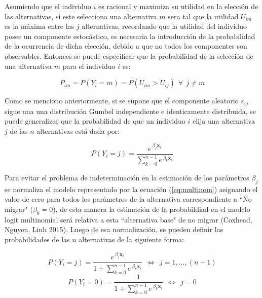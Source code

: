 \documentclass[12pt,a4paper]{article}
\begin{document}
Asumiendo que el individuo $i$ es racional y maximiza su utilidad en la elección de las  alternativas, si este selecciona una alternativa $m$ sera tal que la utilidad $U_{im}$ es la máxima entre las $j$ alternativas, recordando que la utilidad del individuo posee un componente estocástico, es necesaria la introducción de la probabilidad de la ocurrencia de dicha elección, debido a que no todos los componentes son observables. Entonces se puede especificar que  la probabilidad de la selección de una alternativa $m$ para el individuo $i$ es:
\begin {center}
\begin{equation}\label{eq:prob}
P_{im}=P{(Y_{i}=m)} =P(U_{im}>U_{ij}) \ \ \forall \ \ j\neq m
\end{equation}
\end {center}

Como se menciono anteriormente, si se supone que el componente aleatorio $\varepsilon_{ij}$ sigue una una distribución Gumbel independiente e identicamente distribuida, se puede generalizar que la probabilidad de que un individuo $i$ elija una alternativa $j$ de las $n$ alternativas está dada por:
\begin {center}
\begin{equation}\label{eq:multinom}
P{(Y_{i}=j)}=\frac{e^{\ \beta_{j} \textbf{x}_{i}}}{\sum_{k=0}^{n-1}e^{\ \beta_{k} \textbf{x}_{i}}}
\end{equation}
\end {center}

Para evitar el problema de indeterminación en la estimación de los parámetros $\beta_{j}$ se normaliza el modelo representado por la ecuación (\ref{eq:multinom}) asignando el valor de cero para todos los parámetros de la alternativa correspondiente a ``No migrar" ($\beta_{0}=0$), de esta manera la estimación de la probabildiad en el modelo logit multinomial será relativa a esta ``alternativa base" de no migrar (Coxhead, Nguyen, Linh 2015).
Luego de esa normalización, se pueden definir las probabilidades de las $n$ alternativas de la siguiente forma:
\begin {center}
\begin{equation}\label{eq:multinom_2}
P{(Y_{i}=j)}=\frac{e^{\ \beta_{j} \textbf{x}_{i}}}{1+\sum_{k=0}^{n-1}e^{\ \beta_{k} \textbf{x}_{i}}} \ \ \Leftrightarrow \ \ j=1,...,(n-1)
\end{equation}
\begin{equation}\label{eq:multinom_3}
P{(Y_{i}=0)}=\frac{1}{1+\sum_{k=0}^{n-1}e^{\ \beta_{k} \textbf{x}_{i}}} \ \ \Leftrightarrow \ \ j=0
\end{equation}
\end {center}
\end{document}
